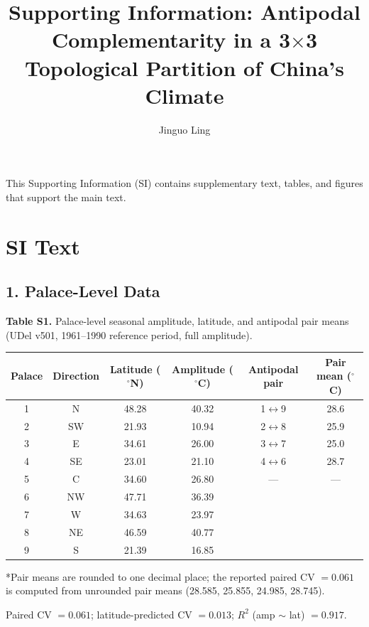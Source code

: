 \documentclass[10pt]{article}
\title{\textbf{Supporting Information: Antipodal Complementarity in a 3$\times$3 Topological Partition of China's Climate}}
\author{Jinguo Ling}
\date{}
\begin{document}
\maketitle

This Supporting Information (SI) contains supplementary text, tables, and figures that support the main text.

\section*{SI Text}

\subsection*{1. Palace-Level Data}

\textbf{Table S1.} Palace-level seasonal amplitude, latitude, and antipodal pair means (UDel v501, 1961--1990 reference period, full amplitude).

\vspace{6pt}

\begin{tabular}{cccccc}
\toprule
Palace & Direction & Latitude ($^\circ$N) & Amplitude ($^\circ$C) & Antipodal pair & Pair mean ($^\circ$C) \\
\midrule
1 & N   & 48.28 & 40.32 & 1$\leftrightarrow$9 & 28.6 \\
2 & SW  & 21.93 & 10.94 & 2$\leftrightarrow$8 & 25.9 \\
3 & E   & 34.61 & 26.00 & 3$\leftrightarrow$7 & 25.0 \\
4 & SE  & 23.01 & 21.10 & 4$\leftrightarrow$6 & 28.7 \\
5 & C   & 34.60 & 26.80 & --- & --- \\
6 & NW  & 47.71 & 36.39 & & \\
7 & W   & 34.63 & 23.97 & & \\
8 & NE  & 46.59 & 40.77 & & \\
9 & S   & 21.39 & 16.85 & & \\
\bottomrule
\end{tabular}

\vspace{6pt}
\footnotesize{*Pair means are rounded to one decimal place; the reported paired CV $= 0.061$ is computed from unrounded pair means (28.585, 25.855, 24.985, 28.745).} \normalsize

\vspace{6pt}
\noindent Paired CV $= 0.061$; latitude-predicted CV $= 0.013$; $R^2$ (amp $\sim$ lat) $= 0.917$.
\end{document}
